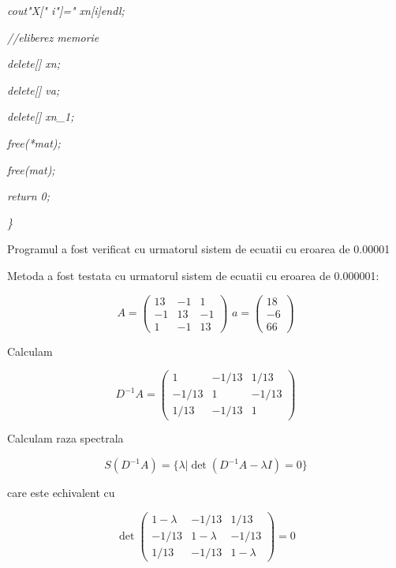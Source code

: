 \documentclass[a4paper,twoside]{book}
\begin{document}
\textit{\qquad \qquad cout\TEXTsymbol{<}\TEXTsymbol{<}"X["\TEXTsymbol{<}%
\TEXTsymbol{<}i\TEXTsymbol{<}\TEXTsymbol{<}"]="\TEXTsymbol{<}\TEXTsymbol{<}%
xn[i]\TEXTsymbol{<}\TEXTsymbol{<}endl;}

\textit{\qquad //eliberez memorie}

\textit{\qquad delete[] xn;}

\textit{\qquad delete[] va;}

\textit{\qquad delete[] xn\_1;}

\textit{\qquad free(*mat);}

\textit{\qquad free(mat);}

\textit{\qquad return 0;}

\textit{\}}

Programul a fost verificat cu urmatorul sistem de ecuatii cu eroarea de
0.00001

Metoda a fost testata cu urmatorul sistem de ecuatii cu eroarea de 0.000001:

\begin{equation*}
A=\left( 
\begin{array}{ccc}
13 & -1 & 1 \\ 
-1 & 13 & -1 \\ 
1 & -1 & 13%
\end{array}%
\right) \,\,a=\left( 
\begin{array}{c}
18 \\ 
-6 \\ 
66%
\end{array}%
\right)
\end{equation*}

Calculam

\begin{equation*}
D^{-1}A=\left( 
\begin{array}{ccc}
1 & -1/13 & 1/13 \\ 
-1/13 & 1 & -1/13 \\ 
1/13 & -1/13 & 1%
\end{array}%
\right)
\end{equation*}

Calculam raza spectrala

\begin{equation*}
S(D^{-1}A)=\{\lambda |\det (D^{-1}A-\lambda I)=0\}
\end{equation*}

care este echivalent cu

\begin{equation*}
\det \left( 
\begin{array}{ccc}
1-\lambda & -1/13 & 1/13 \\ 
-1/13 & 1-\lambda & -1/13 \\ 
1/13 & -1/13 & 1-\lambda%
\end{array}%
\right) =0
\end{equation*}
\end{document}
